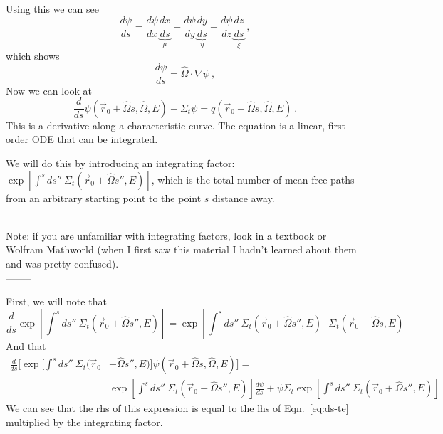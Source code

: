 \documentclass[12pt]{article}
\newcommand{\rvec}{\ensuremath{\vec{r}}}
\newcommand{\vOmega}{\ensuremath{\hat{\Omega}}}
\begin{document}
Using this we can see
\[\frac{d\psi}{ds} = \frac{d\psi}{dx}\underbrace{\frac{dx}{ds}}_{\mu} + \frac{d\psi}{dy}\underbrace{\frac{dy}{ds}}_{\eta} + \frac{d\psi}{dz}\underbrace{\frac{dz}{ds}}_{\xi}\:,\]
which shows 
\[\frac{d\psi}{ds} = \vOmega \cdot \nabla \psi\:,\]
Now we can look at
\begin{equation}
\frac{d}{ds}\psi(\rvec_0 + \vOmega s, \vOmega, E) + \Sigma_t \psi = q(\rvec_0 + \vOmega s, \vOmega, E)\:.
\label{eq:ds-te}
\end{equation}
This is a derivative along a characteristic curve. 
The equation is a linear, first-order ODE that can be integrated. 


We will do this by introducing an integrating factor: $\exp[\int^s ds'' \: \Sigma_t(\rvec_0 + \vOmega s'', E)]$, which is the total number of mean free paths from an arbitrary starting point to the point $s$ distance away.

-----------\\
Note: if you are unfamiliar with integrating factors, look in a textbook or Wolfram Mathworld (when I first saw this material I hadn't learned about them and was pretty confused). \\
--------

First, we will note that
\[\frac{d}{ds}\exp[\int^s ds'' \: \Sigma_t(\rvec_0 + \vOmega s'', E)] = \exp[\int^s ds'' \: \Sigma_t(\rvec_0 + \vOmega s'', E)] \Sigma_t(\rvec_0 + \vOmega s, E)\]
And that
\begin{align*}
\frac{d}{ds}\bigl[\exp[\int^s ds'' \: \Sigma_t(\rvec_0 &+ \vOmega s'', E)]\psi(\rvec_0 + \vOmega s, \vOmega, E)\bigr] =\\ &\exp[\int^s ds'' \: \Sigma_t(\rvec_0 + \vOmega s'', E)]\frac{d \psi}{ds} + \psi \Sigma_t \exp[\int^s ds'' \: \Sigma_t(\rvec_0 + \vOmega s'', E)]
\end{align*}
We can see that the rhs of this expression is equal to the lhs of Eqn.~\ref{eq:ds-te} multiplied by the integrating factor.
\end{document}
